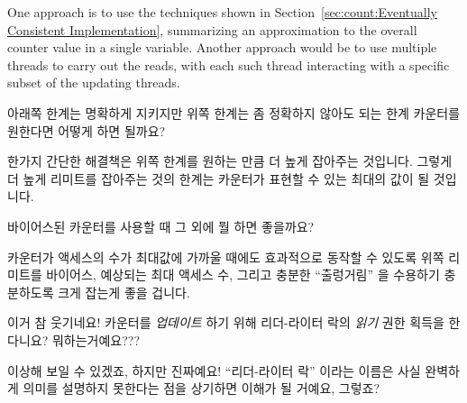 \begin{enumerate}
	One approach is to use the techniques shown in
	Section~\ref{sec:count:Eventually Consistent Implementation},
	summarizing an approximation to the overall counter value in
	a single variable.
	Another approach would be to use multiple threads to carry
	out the reads, with each such thread interacting with a
	specific subset of the updating threads.
	\fi

\QuickQ{}
	아래쪽 한계는 명확하게 지키지만 위쪽 한계는 좀 정확하지 않아도 되는
	한계 카운터를 원한다면 어떻게 하면 될까요?

\QuickA{}
	한가지 간단한 해결책은 위쪽 한계를 원하는 만큼 더 높게 잡아주는 것입니다.
	그렇게 더 높게 리미트를 잡아주는 것의 한계는 카운터가 표현할 수 있는
	최대의 값이 될 것입니다.

\QuickQ{}
	바이어스된 카운터를 사용할 때 그 외에 뭘 하면 좋을까요?

\QuickA{}
	카운터가 액세스의 수가 최대값에 가까울 때에도 효과적으로 동작할 수
	있도록 위쪽 리미트를 바이어스, 예상되는 최대 액세스 수, 그리고 충분한
	``출렁거림'' 을 수용하기 충분하도록 크게 잡는게 좋을 겁니다.

\QuickQ{}
	이거 참 웃기네요!
	카운터를 \emph{업데이트} 하기 위해 리더-라이터 락의 \emph{읽기} 권한
	획득을 한다니요?
	뭐하는거예요???

\QuickA{}
	이상해 보일 수 있겠죠, 하지만 진짜예요!
	``리더-라이터 락'' 이라는 이름은 사실 완벽하게 의미를 설명하지 못한다는
	점을 상기하면 이해가 될 거예요, 그렇죠?

\end{enumerate}
